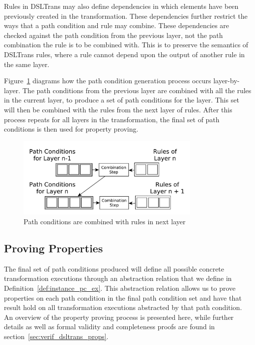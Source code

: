 Rules in DSLTrans may also define dependencies in which elements have been previously created in the transformation. These dependencies further restrict the ways that a path condition and rule may combine. These dependencies are checked against the path condition from the previous layer, not the path combination the rule is to be combined with. This is to preserve the semantics of DSLTrans rules, where a rule cannot depend upon the output of another rule in the same layer.



Figure~\ref{fig:next_layer2} diagrams how the path condition generation process occurs layer-by-layer. The path conditions from the previous layer are combined with all the rules in the current layer, to produce a set of path conditions for the layer. This set will then be combined with the rules from the next layer of rules. After this process repeats for all layers in the transformation, the final set of path conditions is then used for property proving.

\begin{figure}[htb]
              
        \centering
        \includegraphics[width=0.8\textwidth]{./figures/building_path_conditions/next_layer.pdf}
        \caption{Path conditions are combined with rules in next layer}
        \label{fig:next_layer2}
\end{figure}

 
 
\subsection{Proving Properties}

The final set of path conditions produced will define all possible concrete transformation executions through an abstraction relation that we define in Definition~\ref{def:instance_pc_ex}. This abstraction relation allows us to prove properties on each path condition in the final path condition set and have that result hold on all transformation executions abstracted by that path condition. An overview of the property proving process is presented here, while further details as well as formal validity and completeness proofs are found in section~\ref{sec:verif_dsltrans_props}.

